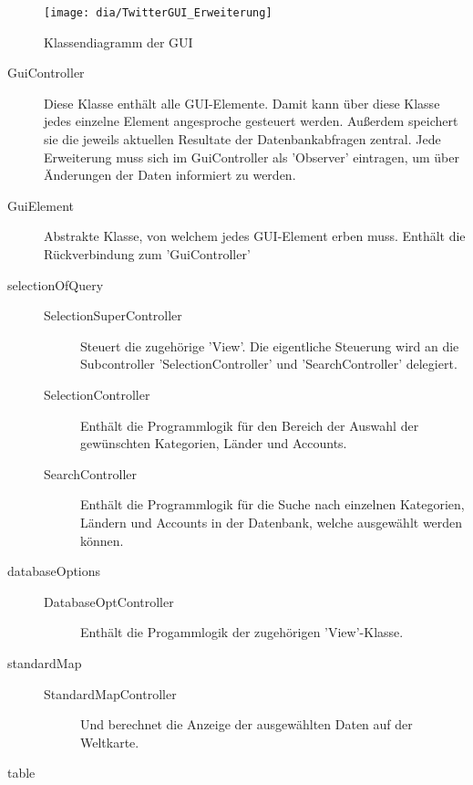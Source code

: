 \begin{figure}[h!]
	\centering
	\texttt{[image: dia/TwitterGUI\_Erweiterung]}
	\caption{Klassendiagramm der GUI}
	\label{fig:GUI}
\end{figure}
\begin{description}
	\item[GuiController] Diese Klasse enthält alle GUI-Elemente. Damit kann über diese Klasse jedes einzelne Element angesproche gesteuert werden. Außerdem speichert sie die jeweils aktuellen Resultate der Datenbankabfragen zentral. Jede Erweiterung muss sich im GuiController als 'Observer' eintragen, um über Änderungen der Daten informiert zu werden. 
	\item[GuiElement] Abstrakte Klasse, von welchem jedes GUI-Element erben muss. Enthält die Rückverbindung zum 'GuiController'
	\item[selectionOfQuery]  
	\quad
		 \begin{description}  	
		\item[SelectionSuperController] Steuert die zugehörige 'View'. Die eigentliche Steuerung wird an die Subcontroller 'SelectionController' und 'SearchController' delegiert.
		\item[SelectionController] Enthält die Programmlogik für den Bereich der Auswahl der gewünschten Kategorien, Länder und Accounts.
		\item[SearchController] Enthält die Programmlogik für die Suche nach einzelnen Kategorien, Ländern und Accounts in der Datenbank, welche ausgewählt werden können. 
		\item[]
		\end{description}
	\item[databaseOptions] 	\quad
		\begin{description}
			\item[DatabaseOptController] Enthält die Progammlogik der zugehörigen 'View'-Klasse.
		\end{description}
    \item[standardMap] \quad
	    \begin{description}
	    	\item [StandardMapController] Und berechnet die Anzeige der ausgewählten Daten auf der Weltkarte.
	    \end{description}
    \item[table] \quad
	    \begin{description}

\end{description}
\end{description}
